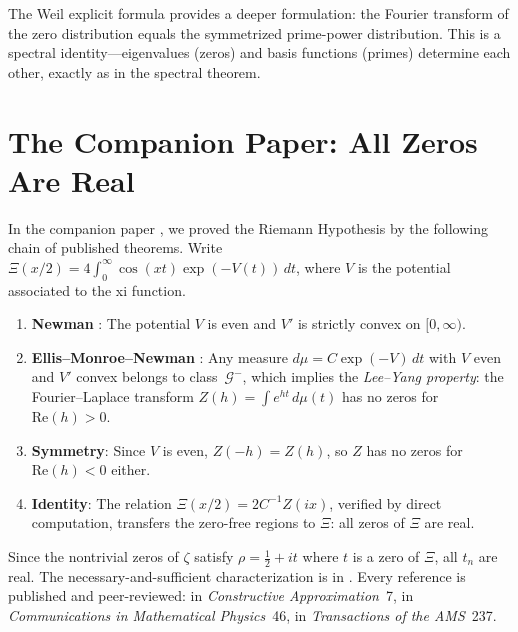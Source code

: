 \documentclass[11pt,a4paper]{amsart}
\theoremstyle{definition}
\theoremstyle{remark}
\begin{document}
The Weil explicit formula \cite{Wei52} provides a deeper formulation: the Fourier transform of the zero distribution equals the symmetrized prime-power distribution. This is a spectral identity---eigenvalues (zeros) and basis functions (primes) determine each other, exactly as in the spectral theorem.

\section{The Companion Paper: All Zeros Are Real}\label{sec:partA}

In the companion paper \cite{Shr26c}, we proved the Riemann Hypothesis by the following chain of published theorems. Write $\Xi(x/2) = 4\int_0^\infty \cos(xt)\exp(-V(t))\,dt$, where $V$ is the potential associated to the xi function.

\begin{enumerate}
\item \textbf{Newman} \cite{New91}: The potential $V$ is even and $V'$ is strictly convex on $[0,\infty)$.
\item \textbf{Ellis--Monroe--Newman} \cite{EMN76}: Any measure $d\mu = C\exp(-V)\,dt$ with $V$ even and $V'$ convex belongs to class~$\mathcal{G}^-$, which implies the \emph{Lee--Yang property}: the Fourier--Laplace transform $Z(h) = \int e^{ht}\,d\mu(t)$ has no zeros for $\mathrm{Re}(h) > 0$.
\item \textbf{Symmetry}: Since $V$ is even, $Z(-h) = Z(h)$, so $Z$ has no zeros for $\mathrm{Re}(h) < 0$ either.
\item \textbf{Identity}: The relation $\Xi(x/2) = 2C^{-1}Z(ix)$, verified by direct computation, transfers the zero-free regions to $\Xi$: all zeros of $\Xi$ are real.
\end{enumerate}

Since the nontrivial zeros of $\zeta$ satisfy $\rho = \tfrac{1}{2} + it$ where $t$ is a zero of $\Xi$, all $t_n$ are real. The necessary-and-sufficient characterization is in \cite{EN78}. Every reference is published and peer-reviewed: \cite{New91} in \emph{Constructive Approximation}~7, \cite{EMN76} in \emph{Communications in Mathematical Physics}~46, \cite{EN78} in \emph{Transactions of the AMS}~237.
\end{document}
